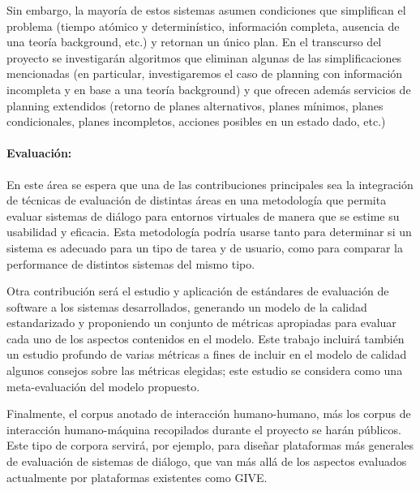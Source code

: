 Sin embargo, la mayor\'ia de estos sistemas asumen condiciones
que simplifican el problema (tiempo at\'omico y
determin\'istico, informaci\'on completa, ausencia de una teor\'ia
background, etc.) y retornan un \'unico plan.  En el transcurso
del proyecto se investigar\'an algoritmos que eliminan algunas
de las simplificaciones mencionadas (en particular, investigaremos
el caso de planning con informaci\'on incompleta y en base a una
teor\'ia background) y que ofrecen adem\'as servicios de planning
extendidos (retorno de planes alternativos, planes m\'inimos, planes
condicionales, planes incompletos, acciones posibles en un estado dado, etc.)

\paragraph{Evaluaci\'on:}
En este \'area se espera que una de las contribuciones principales sea la
integraci\'on de t\'ecnicas de evaluaci\'on de distintas \'areas en una
metodolog\'ia que permita evaluar sistemas de di\'alogo para entornos virtuales
de manera que se estime su usabilidad y eficacia. Esta metodolog\'ia
podr\'ia usarse tanto para determinar si un sistema es adecuado para un tipo de
tarea y de usuario, como para comparar la performance de distintos sistemas del
mismo tipo.

Otra contribuci\'on ser\'a el estudio y aplicaci\'on de est\'andares de
evaluaci\'on de software a los sistemas desarrollados, generando un modelo de la
calidad estandarizado y proponiendo un conjunto de m\'etricas apropiadas para
evaluar cada uno de los aspectos contenidos en el modelo. Este trabajo
incluir\'a tambi\'en un estudio profundo de varias m\'etricas a fines de incluir
en el modelo de calidad algunos consejos sobre las m\'etricas elegidas; este
estudio se considera como una meta-evaluaci\'on del modelo propuesto.

Finalmente,
el corpus anotado de interacci\'on humano-humano, m\'as
los corpus de interacci\'on humano-m\'aquina recopilados
durante el proyecto se har\'an p\'ublicos.  Este tipo de
corpora servir\'a, por ejemplo, para dise\~nar plataformas
m\'as generales de evaluaci\'on de sistemas de di\'alogo,
que van m\'as all\'a de los aspectos evaluados actualmente
por plataformas existentes como GIVE.


